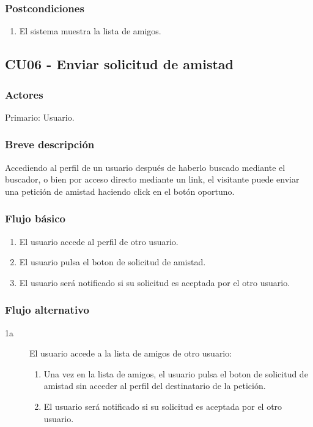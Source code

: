 \documentclass[12pt, a4paper, titlepage]{article}
\begin{document}
\subsubsection{Postcondiciones}
\begin{enumerate}
	\item El sistema muestra la lista de amigos.
\end{enumerate}



\subsection{CU06 - Enviar solicitud de amistad}
\subsubsection{Actores}
Primario: Usuario.
\subsubsection{Breve descripción}
 Accediendo al perfil de un usuario después de haberlo buscado mediante el buscador, o bien por acceso directo mediante un link, el visitante puede enviar una petición de amistad haciendo click en el botón oportuno.
\subsubsection{Flujo básico}
\begin{enumerate}
	\item El usuario accede al perfil de otro usuario.
	\item El usuario pulsa el boton de solicitud de amistad.
	\item El usuario será notificado si su solicitud es aceptada por el otro usuario.
\end{enumerate}
\subsubsection{Flujo alternativo}
\begin{description}
\item[1a] El usuario accede a la lista de amigos de otro usuario:
	\begin{enumerate}
		\item Una vez en la lista de amigos, el usuario pulsa el boton de solicitud de amistad sin acceder al perfil del destinatario de la petición.
		\item El usuario será notificado si su solicitud es aceptada por el otro usuario.
	\end{enumerate}
\end{description}
\end{document}
